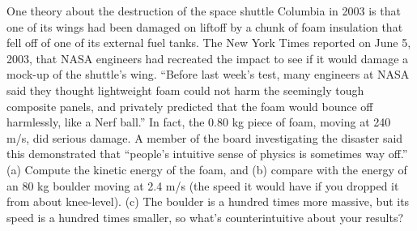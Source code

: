 One theory about the destruction of the space shuttle
Columbia in 2003 is that one of its wings had been damaged
on liftoff by a chunk of foam insulation that fell off of
one of its external fuel tanks. The New York Times reported
on June 5, 2003, that NASA engineers had recreated the
impact to see if it would damage a mock-up of the shuttle's
wing. ``Before last week's test, many engineers at NASA said
they thought lightweight foam could not harm the seemingly
tough composite panels, and privately predicted that the
foam would bounce off harmlessly, like a Nerf ball.'' In
fact, the 0.80 kg piece of foam, moving at 240 m/s,
did serious damage. A member of the board investigating
the disaster said this demonstrated that ``people's
intuitive sense of physics is sometimes way off.'' (a)
Compute the kinetic energy of the foam, and (b) compare with
the energy of an 80 kg boulder moving at 2.4 m/s (the
speed it would have if you dropped it from about knee-level).\answercheck\hwendpart
(c) The boulder is a hundred times
more massive, but its speed is a hundred times smaller, so
what's counterintuitive about your results?
